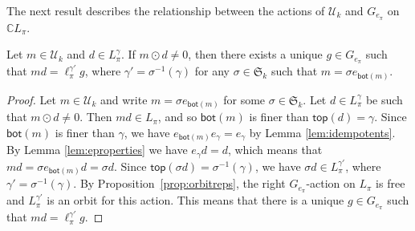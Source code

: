 \documentclass[ALCO,Unicode]{cedram}
\newcommand{\CC}{\mathbb C}
\begin{document}
The next result describes the relationship between the actions of
$\mathcal{U}_k$ and $G_{e_\pi}$ on $\CC{L_\pi}$.
\begin{prop}\label{prop:GeactiononL}
Let $m\in \mathcal{U}_k$ and $d\in L_\pi^\gamma$. If $m \odot d \neq 0$,
then there exists a unique $g \in G_{e_\pi}$  such that $md = \ell_\pi^{\gamma'} g$,
where $\gamma' = \sigma^{-1}(\gamma)$ for any $\sigma \in \mathfrak{S}_k$ such that $m = \sigma e_{\mathsf{bot}(m)}$.
\end{prop}
\begin{proof}
Let $m\in \mathcal{U}_k$ and write $m = \sigma e_{\mathsf{bot}(m)}$ for some $\sigma \in \mathfrak{S}_k$.
Let $d\in L_\pi^\gamma$ be such that $m \odot d \neq 0$.
Then $md \in L_\pi$, and so $\mathsf{bot}(m)$ is finer than $\mathsf{top}(d) = \gamma$.
Since $\mathsf{bot}(m)$ is finer than $\gamma$, we have $e_{\mathsf{bot}(m)} e_\gamma = e_\gamma$ by Lemma \ref{lem:idempotents}.
By Lemma \ref{lem:eproperties} we have $e_\gamma d = d$, which means that $md = \sigma e_{\mathsf{bot}(m)} d = \sigma d$.
Since $\mathsf{top}(\sigma d) = \sigma^{-1}(\gamma)$, we have $\sigma d \in L_\pi^{\gamma'}$, where $\gamma' = \sigma^{-1}(\gamma)$.
By Proposition~\ref{prop:orbitreps},
the right $G_{e_\pi}$-action on $L_\pi$ is free and $L_\pi^{\gamma'}$ is an orbit for this action.
This means that there is a unique $g\in G_{e_\pi}$ such that $m d = \ell_\pi^{\gamma'} g$.
\end{proof}
\end{document}
